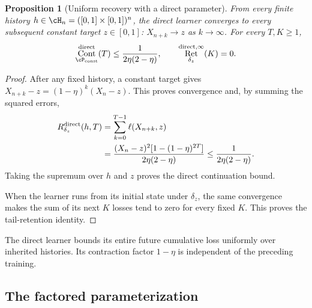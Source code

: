 \documentclass[11pt,twoside]{article}
\newtheorem{proposition}[theorem]{Proposition}
\theoremstyle{definition}
\theoremstyle{remark}
\DeclareMathOperator{\Cont}{Cont}
\DeclareMathOperator{\Ret}{Ret}
\begin{document}
\begin{proposition}[Uniform recovery with a direct parameter]
\label{ex:direct}
From every finite history $h\in\cH_n=([0,1]\times[0,1])^n$, the direct
learner converges to every subsequent constant target $z\in[0,1]$:
$X_{n+k}\to z$ as $k\to\infty$. For every $T,K\ge1$,
\[
 \Cont_{\cP_{\rm const}}^{\rm direct}(T)
 \le\frac1{2\eta(2-\eta)},\qquad
 \Ret_{\delta_z}^{{\rm direct},\infty}(K)=0.
\]
\end{proposition}
\begin{proof}
After any fixed history, a constant target gives
$X_{n+k}-z=(1-\eta)^k(X_n-z)$.
This proves convergence and, by summing the squared errors,
\begin{equation}
 \begin{aligned}
 R_{\delta_z}^{\rm direct}(h,T)
 &=\sum_{k=0}^{T-1}\ell(X_{n+k},z)\\
 &=\frac{(X_n-z)^2[1-(1-\eta)^{2T}]}{2\eta(2-\eta)}
 \le\frac1{2\eta(2-\eta)}.
 \end{aligned}
 \label{eq:direct-sum}
\end{equation}
Taking the supremum over $h$ and $z$ proves the direct continuation bound.

When the learner runs from its initial state under $\delta_z$, the same
convergence makes the sum of its next $K$ losses tend to zero for every
fixed $K$. This proves the tail-retention identity.
\end{proof}

The direct learner bounds its entire future cumulative loss uniformly over
inherited histories. Its contraction factor $1-\eta$ is independent of
the preceding training.

\subsection{The factored parameterization}
\end{document}
